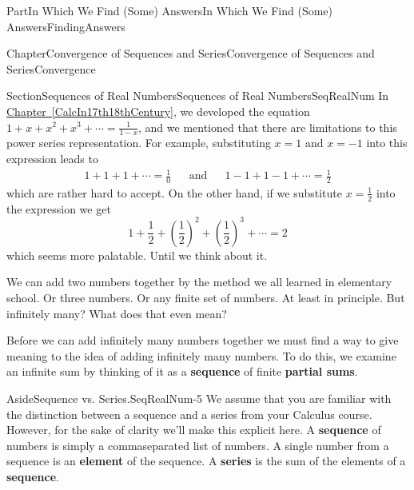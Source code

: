\documentclass[oneside,10pt,]{book}
\newcommand{\xreffont}{\relax}
\newcommand{\terminology}[1]{\textbf{#1}}
\numberwithin{equation}{part}
\newcommand{\amp}{&}
\begin{document}
\begin{partptx}{Part}{In Which We Find (Some) Answers}{}{In Which We Find (Some) Answers}{}{}{FindingAnswers}
\renewcommand*{\partname}{Part}
%
%
\typeout{************************************************}
\typeout{************************************************}
%
\begin{chapterptx}{Chapter}{Convergence of Sequences and Series}{}{Convergence of Sequences and Series}{}{}{Convergence}
\renewcommand*{\chaptername}{Chapter}
%
%
\typeout{************************************************}
\typeout{************************************************}
%
\begin{sectionptx}{Section}{Sequences of Real Numbers}{}{Sequences of Real Numbers}{}{}{SeqRealNum}
In \hyperref[CalcIn17th18thCentury]{Chapter~{\xreffont\ref{CalcIn17th18thCentury}}}, we developed the equation \(1+x+x^2+x^3+\cdots=\frac{1}{1-x}\), and we mentioned that there are  limitations to this power series representation.  For example, substituting \(x=1\) and \(x=-1\) into this expression leads to%
\begin{align*}
1+1+1+\cdots=\frac{1}{0}\amp{}\amp{} \text{and}\amp{}\amp{}  1-1+1-1+\cdots=\frac{1}{2}
\end{align*}
which are rather hard to accept.  On the other hand, if we substitute \(x=\frac{1}{2}\) into the expression we get%
\begin{equation}
1+\frac{1}{2}+\left(\frac{1}{2}\right)^2+\left(\frac{1}{2}\right)^3+\cdots=2\label{EQUATIONSeqVsSer}
\end{equation}
which seems more palatable. Until we think about it.%
\par
We can add two numbers together by the method we all learned in elementary school.  Or three numbers.  Or any finite set of numbers. At least in principle.  But infinitely many?  What does that even mean?%
\par
Before we can add infinitely many numbers together we must find a way to give meaning to the idea of adding infinitely many numbers. To do this, we examine an infinite sum by thinking of it as a \terminology{sequence} of finite \terminology{partial sums}.%
\begin{aside}{Aside}{Sequence vs. Series.}{SeqRealNum-5}%
%
We assume that you are familiar with the distinction between a sequence and a series from your Calculus course. However, for the sake of clarity we'll make this explicit here. A \terminology{sequence} of numbers is simply a comma\textendash{}separated list of numbers. A single number from a sequence is an \terminology{element} of the sequence.  A \terminology{series} is the sum of the elements of a \terminology{sequence}.%

\end{aside}
\end{sectionptx}
\end{chapterptx}
\end{partptx}
\end{document}
